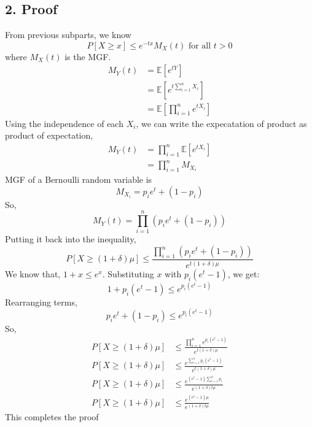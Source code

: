\begin{solution}
	\subsection*{2. Proof}
	From previous subparts, we know
	\[P[X\geq x]\leq e^{-tx}M_X(t) \text{ for all } t>0\]
	where $M_X(t)$ is the MGF.
	\begin{align}
		M_Y(t) & = \mathds{E}[e^{tY}]                             \\
		       & = \mathds{E}[e^{t\sum_{i=1}^{n}X_i}]             \\
		       & = \mathds{E}\left[\prod_{i=1}^{n}e^{tX_i}\right]
	\end{align}
	Using the independence of each $X_i$, we can write the expecatation of product as product of expectation,
	\begin{align}
		M_Y(t) & = \prod_{i=1}^{n}\mathds{E}[e^{tX_i}] \\
		       & = \prod_{i=1}^{n}M_{X_i}
	\end{align}
	MGF of a Bernoulli random variable is
	\[M_{X_i} = p_ie^t+(1-p_i)\]
	So,
	\[
		M_Y(t) = \prod_{i=1}^{n}(p_ie^t+(1-p_i))
	\]
	Putting it back into the inequality,
	\[P[X\geq (1+\delta)\mu]\leq \frac{\prod_{i=1}^{n}(p_ie^t+(1-p_i))}{e^{t(1+\delta)\mu}}\]
	We know that, $1+x \leq e^x$. Substituting $x$ with $p_i(e^t-1)$, we get:
	\[1+p_i(e^t-1) \leq e^{p_i(e^t-1)}\]
	Rearranging terms,
	\[p_ie^t + (1-p_i) \leq e^{p_i(e^t-1)} \]
	So,
	\begin{align}
		P[X\geq (1+\delta)\mu] & \leq \frac{\prod_{i=1}^{n}e^{p_i(e^t-1)}}{e^{t(1+\delta)\mu}} \\
		P[X\geq (1+\delta)\mu] & \leq \frac{e^{\sum_{i=1}^{n}p_i(e^t-1)}}{e^{t(1+\delta)\mu}}  \\
		P[X\geq (1+\delta)\mu] & \leq \frac{e^{(e^t-1)\sum_{i=1}^{n}p_i}}{e^{(1+\delta)t\mu}}  \\
		P[X\geq (1+\delta)\mu] & \leq \frac{e^{(e^t-1)\mu}}{e^{(1+\delta)t\mu}}
	\end{align}
	This completes the proof
\end{solution}
